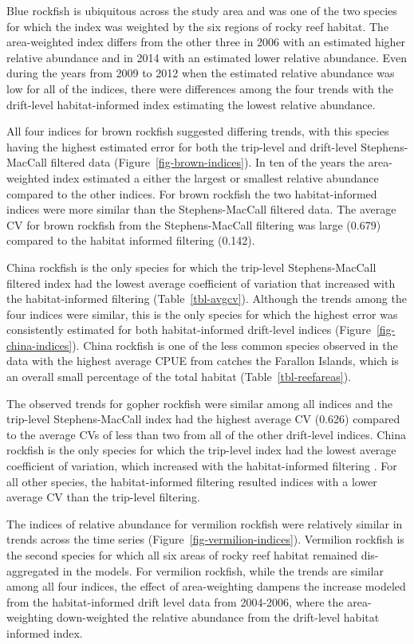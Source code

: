 \documentclass[
  12pt,
  authoryear,
  preprint,
  3p]{elsarticle}
\begin{document}
Blue rockfish is ubiquitous across the study area and was one of the two
species for which the index was weighted by the six regions of rocky
reef habitat. The area-weighted index differs from the other three in
2006 with an estimated higher relative abundance and in 2014 with an
estimated lower relative abundance. Even during the years from 2009 to
2012 when the estimated relative abundance was low for all of the
indices, there were differences among the four trends with the
drift-level habitat-informed index estimating the lowest relative
abundance.

All four indices for brown rockfish suggested differing trends, with
this species having the highest estimated error for both the trip-level
and drift-level Stephens-MacCall filtered data
(Figure~\ref{fig-brown-indices}). In ten of the years the area-weighted
index estimated a either the largest or smallest relative abundance
compared to the other indices. For brown rockfish the two
habitat-informed indices were more similar than the Stephens-MacCall
filtered data. The average CV for brown rockfish from the
Stephens-MacCall filtering was large (0.679) compared to the habitat
informed filtering (0.142).

China rockfish is the only species for which the trip-level
Stephens-MacCall filtered index had the lowest average coefficient of
variation that increased with the habitat-informed filtering
(Table~\ref{tbl-avgcv}). Although the trends among the four indices were
similar, this is the only species for which the highest error was
consistently estimated for both habitat-informed drift-level indices
(Figure~\ref{fig-china-indices}). China rockfish is one of the less
common species observed in the data with the highest average CPUE from
catches the Farallon Islands, which is an overall small percentage of
the total habitat (Table~\ref{tbl-reefareas}).

The observed trends for gopher rockfish were similar among all indices
and the trip-level Stephens-MacCall index had the highest average CV
(0.626) compared to the average CVs of less than two from all of the
other drift-level indices. China rockfish is the only species for which
the trip-level index had the lowest average coefficient of variation,
which increased with the habitat-informed filtering . For all other
species, the habitat-informed filtering resulted indices with a lower
average CV than the trip-level filtering.

The indices of relative abundance for vermilion rockfish were relatively
similar in trends across the time series
(Figure~\ref{fig-vermilion-indices}). Vermilion rockfish is the second
species for which all six areas of rocky reef habitat remained
dis-aggregated in the models. For vermilion rockfish, while the trends
are similar among all four indices, the effect of area-weighting dampens
the increase modeled from the habitat-informed drift level data from
2004-2006, where the area-weighting down-weighted the relative abundance
from the drift-level habitat informed index.
\end{document}
